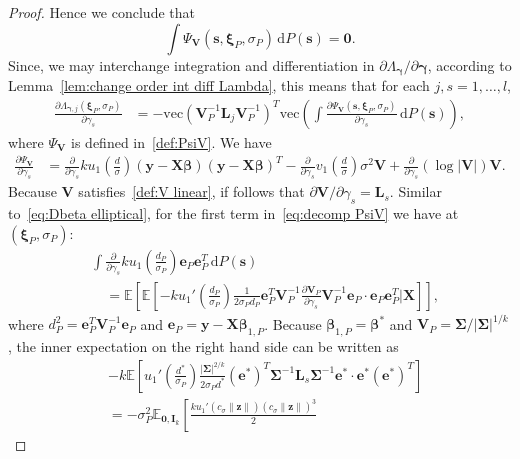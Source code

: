 \documentclass[10pt,a4paper]{amsart}
\newcommand{\E}{\mathbb{E}}
\newcommand{\bI}{\mathbf{I}}
\newcommand{\bL}{\mathbf{L}}
\newcommand{\bSigma}{\mathbf{\Sigma}}
\newcommand{\bV}{\mathbf{V}}
\newcommand{\bX}{\mathbf{X}}
\newcommand{\bbeta}{\bm\beta}
\newcommand{\be}{\mathbf{e}}
\newcommand{\bgamma}{\bm\gamma}
\newcommand{\bs}{\mathbf{s}}
\newcommand{\bxi}{\bm\xi}
\newcommand{\by}{\mathbf{y}}
\newcommand{\bz}{\mathbf{z}}
\newcommand{\dd}{\mathrm{d}}
\newcommand{\vc}{\mathrm{vec}}
\begin{document}
\begin{proof}
Hence we conclude that 
\[
\int \Psi_{\bV}(\bs,\bxi_P,\sigma_P)\,\text{d}P(\bs)=\mathbf{0}.
\]
Since, we may interchange integration and differentiation in $\partial\Lambda_{\bgamma}/\partial\bgamma$,
according to Lemma~\ref{lem:change order int diff Lambda},
this means that
for each $j,s=1,\ldots,l$,
\begin{equation}
\label{eq:Dlambda-gamma}
\begin{split}
\frac{\partial\Lambda_{\bgamma,j}(\bxi_P,\sigma_P)}{\partial \gamma_s}
&=
-
\vc\left(\bV_P^{-1}\bL_j\bV_P^{-1}\right)^T\vc\left(
\int
\frac{\partial\Psi_{\bV}(\bs,\bxi_P,\sigma_P)}{\partial \gamma_s}
\,\dd P(\bs)
\right),
\end{split}
\end{equation}
where $\Psi_\bV$ is defined in~\eqref{def:PsiV}.
We have
\begin{equation}
\label{eq:decomp PsiV}
\begin{split}
\frac{\partial \Psi_\bV}{\partial\gamma_s}
&=
\frac{\partial}{\partial\gamma_s}
k
u_1\left(\frac{d}{\sigma}\right)
(\by-\bX\bbeta)(\by-\bX\bbeta)^T
-
\frac{\partial}{\partial\gamma_s}
v_1\left(\frac{d}{\sigma}\right)\sigma^2\mathbf{V}
+
\frac{\partial}{\partial\gamma_s}
(\log|\bV|)\mathbf{V}.
\end{split}
\end{equation}
Because $\bV$ satisfies~\eqref{def:V linear}, if follows that $\partial\bV/\partial\gamma_s=\bL_s$.
Similar to~\eqref{eq:Dbeta elliptical}, for the first term in~\eqref{eq:decomp PsiV} we have at~$(\bxi_P,\sigma_P)$:
\[
\begin{split}
&\int
\frac{\partial}{\partial\gamma_s}
k
u_1\left(\frac{d_P}{\sigma_P}\right)
\be_P\be_P^T
\,\text{d}P(\bs)\\
&\quad=
\E
\left[
\E
\left[
-k
u_1'\left(\frac{d_P}{\sigma_P}\right)
\frac{1}{2\sigma_P d_P}
\be_P^T\bV_P^{-1}\frac{\partial\bV_P}{\partial\gamma_s}\bV_P^{-1}\be_P
\cdot
\be_P\be_P^T
\bigg|
\bX
\right]
\right],
\end{split}
\]
where $d_P^2=\be_P^T\bV_P^{-1}\be_P$ and $\be_P=\by-\bX\bbeta_{1,P}$.
Because $\bbeta_{1,P}=\bbeta^*$ and $\bV_P=\bSigma/|\bSigma|^{1/k}$, 
the inner expectation on the right hand side can be written as
\[
\begin{split}
&
-k
\E
\left[
u_1'\left(\frac{d^*}{\sigma_P}\right)
\frac{|\bSigma|^{2/k}}{2\sigma_Pd^*}
(\be^*)^T\bSigma^{-1}\bL_s\bSigma^{-1}\be^*
\cdot
\be^*(\be^*)^T
\right]\\
&=
-
\sigma_P^2
\E_{\mathbf{0},\bI_k}
\left[
\frac{ku_1'\left(c_\sigma\|\bz\|\right)(c_\sigma\|\bz\|)^3}2

\end{split}\]
\end{proof}
\end{document}
